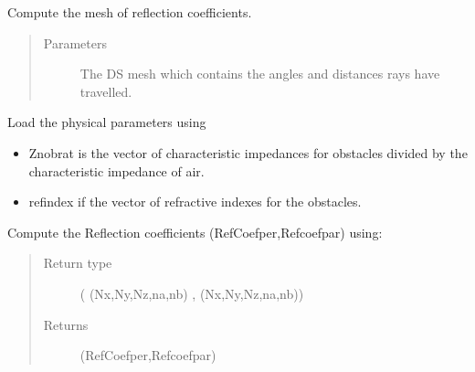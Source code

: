 \documentclass[letterpaper,10pt,english]{sphinxmanual}
\begin{document}
\begin{fulllineitems}
\label{\detokenize{index:RayTracerMainProgram.RefCoefComputation}}
Compute the mesh of reflection coefficients.
\begin{quote}\begin{description}
\item[{Parameters}] \leavevmode
{} \textendash{} The DS mesh which contains the angles and distances rays   have travelled.

\end{description}\end{quote}

Load the physical parameters using
{\hyperref[\detokenize{index:ParameterInput.ObstacleCoefficients}]{}}
\begin{itemize}
\item {} 
Znobrat \sphinxhyphen{} is the vector of characteristic impedances for obstacles   divided by the characteristic impedance of air.

\item {} 
refindex \sphinxhyphen{} if the vector of refractive indexes for the obstacles.

\end{itemize}

Compute the Reflection coefficients (RefCoefper,Refcoefpar) using:   {\hyperref[\detokenize{index:DictionarySparseMatrix.ref_coef}]{}}
\begin{quote}\begin{description}
\item[{Return type}] \leavevmode
({\hyperref[\detokenize{index:DictionarySparseMatrix.DS}]{}} (Nx,Ny,Nz,na,nb)    , {\hyperref[\detokenize{index:DictionarySparseMatrix.DS}]{}} (Nx,Ny,Nz,na,nb))

\item[{Returns}] \leavevmode
(RefCoefper,Refcoefpar)

\end{description}\end{quote}

\end{fulllineitems}
\end{document}
